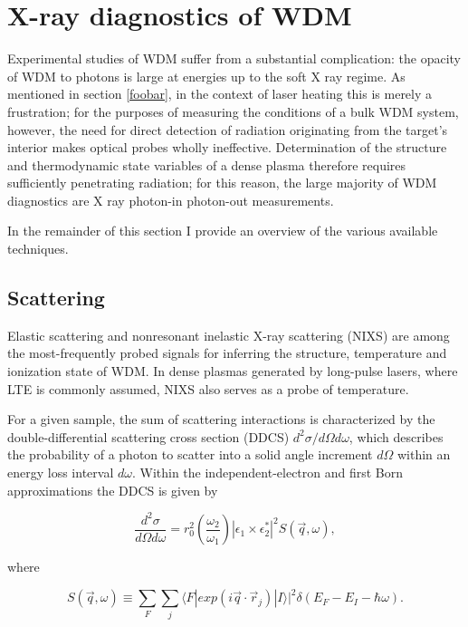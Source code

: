 \documentclass [11pt, proquest, article] {uwthesis}[2016/11/22]
\begin{document}
\section{X-ray diagnostics of WDM}
Experimental studies of WDM suffer from a substantial complication: the opacity of WDM to photons is large at energies up to the soft X ray regime. As mentioned in section \ref{foobar}, in the context of laser heating this is merely a frustration; for the purposes of measuring the conditions of a bulk WDM system, however, the need for direct detection of radiation originating from the target's interior makes optical probes wholly ineffective. Determination of the structure and thermodynamic state variables of a dense plasma therefore requires sufficiently penetrating radiation; for this reason, the large majority of WDM diagnostics are X ray photon-in photon-out measurements. 

In the remainder of this section I provide an overview of the various available techniques.

\subsection{Scattering}
Elastic scattering and nonresonant inelastic X-ray scattering (NIXS) are among the most-frequently probed signals for inferring the structure, temperature and ionization state of WDM. In dense plasmas generated by long-pulse lasers, where LTE is commonly assumed, NIXS also serves as a probe of temperature.

For a given sample, the sum of scattering interactions is characterized by the double-differential scattering cross section (DDCS) $d^2\sigma/d\Omega d\omega$, which describes the probability of a photon to scatter into a solid angle increment $d\Omega$ within an energy loss interval $d\omega$. Within the independent-electron and first Born approximations the DDCS is given by

\begin{equation} \label{ddcs}
\frac{d^2\sigma}{d\Omega d\omega} = r_0^2 (\frac{\omega_2}{\omega_1}) |\epsilon_1 \times \epsilon_2^*|^2 S(\vec{q}, \omega),
\end{equation}

where 


\begin{equation} \label{sofq}
S(\vec{q}, \omega) \equiv \sum_F  \sum_j\langle F|  exp(i \vec{q} \cdot \vec{r}_j) |I\rangle |^2 \delta(E_F - E_I - \hbar \omega).
\end{equation}
\end{document}
